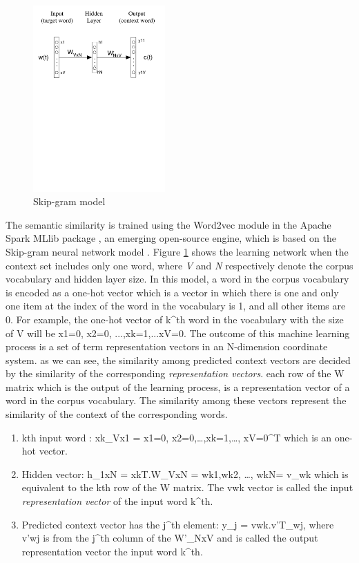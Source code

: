 \documentclass[Journal, BackFigs, DoubleSpace]{ascelike} %
\begin{document}
\begin{figure}[t]
	\centering
	\includegraphics[width=0.45\textwidth]{Figure4_skip-gram-model}
	\caption{Skip-gram model}
	\label{fig:skip-gram}
\end{figure}
%
The semantic similarity is trained using the Word2vec module in the Apache Spark MLlib package \cite{apache16}, an emerging open-source engine, which is based on the Skip-gram neural network model \cite{mikolov13a}. Figure \ref{fig:skip-gram} shows the learning network when the context set includes only one word, where \textit{V} and \textit{N} respectively denote the corpus vocabulary and hidden layer size. In this model, a word in the corpus vocabulary is encoded as a one-hot vector which is a vector in which there is one and only one item at the index of the word in the vocabulary is 1, and all other items are 0. For example, the one-hot vector of k^th word in the vocabulary with the size of V will be {x1=0, x2=0, ...,xk=1,...xV=0}. The outcome of this machine learning process is a set of term representation vectors  in an N-dimension coordinate system. as we can see, the similarity among predicted context vectors are decided by the similarity of the corresponding \textit{representation vectors}. each row of the W matrix which is the output of the learning process, is a representation vector of a word in the corpus vocabulary. The similarity among these vectors represent the similarity of the context of the corresponding words. 
%
\begin{enumerate}
	\item kth input word : {xk}_Vx1 = {x1=0, x2=0,…,xk=1,…, xV=0}^T which is an one-hot vector.
	\item Hidden vector: {h}_1xN = {xk}T.W_VxN = {wk1,wk2, …, wkN}= v_wk which is equivalent to the kth row of the W matrix. The vwk vector is called the  input \textit{representation vector} of the input word k^th.
	\item Predicted context vector has the j^th element: y_j = vwk.v’T_wj, where v’wj is from the j^th column of the W’_NxV and is called the output representation vector the input word k^th. 
\end{enumerate}
\end{document}

